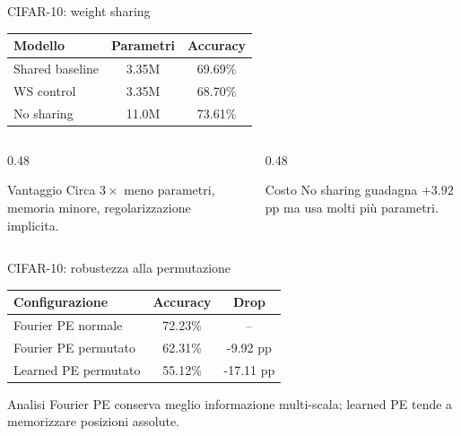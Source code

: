 \documentclass[aspectratio=169,10pt]{beamer}
\begin{document}
\begin{frame}{CIFAR-10: weight sharing}
\small
\begin{center}
\begin{tabular}{lcc}
\toprule
\textbf{Modello} & \textbf{Parametri} & \textbf{Accuracy} \\
\midrule
Shared baseline & 3.35M & 69.69\% \\
WS control & 3.35M & 68.70\% \\
No sharing & 11.0M & 73.61\% \\
\bottomrule
\end{tabular}
\end{center}

\begin{columns}[T]
\begin{column}{0.48\textwidth}
\begin{exampleblock}{Vantaggio}
Circa $3\times$ meno parametri, memoria minore, regolarizzazione implicita.
\end{exampleblock}
\end{column}
\begin{column}{0.48\textwidth}
\begin{alertblock}{Costo}
No sharing guadagna $+3.92$ pp ma usa molti più parametri.
\end{alertblock}
\end{column}
\end{columns}
\end{frame}

\begin{frame}{CIFAR-10: robustezza alla permutazione}
\small
\begin{center}
\begin{tabular}{lcc}
\toprule
\textbf{Configurazione} & \textbf{Accuracy} & \textbf{Drop} \\
\midrule
Fourier PE normale & 72.23\% & -- \\
Fourier PE permutato & 62.31\% & -9.92 pp \\
Learned PE permutato & 55.12\% & -17.11 pp \\
\bottomrule
\end{tabular}
\end{center}

\begin{block}{Analisi}
Fourier PE conserva meglio informazione multi-scala; learned PE tende a memorizzare posizioni assolute.
\end{block}
\end{frame}
\end{document}
